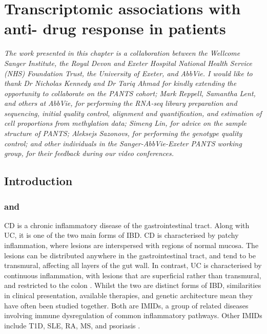 %
%

\chapter{Transcriptomic associations with anti- drug response in  patients}
\label{ch:multiPANTS}

\textit{
    The work presented in this chapter is a collaboration between 
    the Wellcome Sanger Institute,
    the Royal Devon and Exeter Hospital National Health Service (NHS) Foundation Trust,
    the University of Exeter,
    and AbbVie.
    I would like to thank 
    Dr Nicholas Kennedy and Dr Tariq Ahmad for kindly extending the opportunity to collaborate on the PANTS cohort;
    Mark Reppell, Samantha Lent, and others at AbbVie, for performing the RNA-seq library preparation and sequencing, initial quality control, alignment and quantification, and estimation of cell proportions from methylation data;
    Simeng Lin, for advice on the sample structure of PANTS;
    Aleksejs Sazonovs, for performing the genotype quality control;
    and other individuals in the Sanger-AbbVie-Exeter PANTS working group, for their feedback during our video conferences.
}

\section{Introduction}

\subsection{ and }

\gls{CD} is a chronic inflammatory disease of the gastrointestinal tract.
Along with \gls{UC}, it is one of the two main forms of \gls{IBD}.
\gls{CD} is characterised by patchy inflammation, where lesions are interspersed with regions of normal mucosa. 
The lesions can be distributed anywhere in the gastrointestinal tract, and tend to be transmural, affecting all layers of the gut wall.
In contrast, \gls{UC} is characterised by continuous inflammation, with lesions that are superficial rather than transmural, and restricted to the colon \autocite{roda2020CrohnDisease}.
Whilst the two are distinct forms of \gls{IBD}, similarities in clinical presentation, available therapies, and genetic architecture mean they have often been studied together.
Both are \glspl{IMID}, a group of related diseases involving immune dysregulation of common inflammatory pathways.
Other \glspl{IMID} include \gls{T1D}, \gls{SLE}, \gls{RA}, \gls{MS}, and psoriasis \autocite{cotsapas2013ImmunemediatedDiseaseGenetics,david2018GeneticsImmunemediatedInflammatory}.

